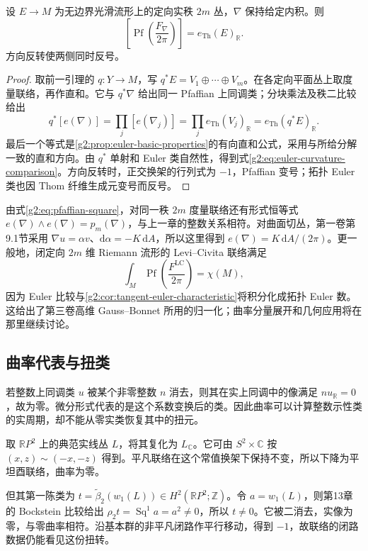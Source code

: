 \begin{theorem}\label{g2:thm:chern-weil-euler-comparison}
	设 \(E\to M\) 为无边界光滑流形上的定向实秩 \(2m\) 丛，\(\nabla\) 保持给定内积。则
	\begin{equation}\label{g2:eq:euler-curvature-comparison}
		\left[\operatorname{Pf}\!\left(\frac{F_\nabla}{2\pi}\right)\right]
		=e_{\mathrm{Th}}(E)_{\mathbb R}.
	\end{equation}
	方向反转使两侧同时反号。
\end{theorem}
\begin{proof}
	取前一引理的 \(q:Y\to M\)，写 \(q^*E=V_1\oplus\cdots\oplus V_m\)。在各定向平面丛上取度量联络，再作直和。它与 \(q^*\nabla\) 给出同一 Pfaffian 上同调类；分块乘法及秩二比较给出
	\[
		q^*[e(\nabla)]
		=\prod_j[e(\nabla_j)]
		=\prod_j e_{\mathrm{Th}}(V_j)_{\mathbb R}
		=e_{\mathrm{Th}}(q^*E)_{\mathbb R}.
	\]
	最后一个等式是\cref{g2:prop:euler-basic-properties}的有向直和公式，采用与所给分解一致的直和方向。由 \(q^*\) 单射和 Euler 类自然性，得到式\eqref{g2:eq:euler-curvature-comparison}。方向反转时，正交换架的行列式为 \(-1\)，Pfaffian 变号；拓扑 Euler 类也因 Thom 纤维生成元变号而反号。
\end{proof}

由式\eqref{g2:eq:pfaffian-square}，对同一秩 \(2m\) 度量联络还有形式恒等式 \(e(\nabla)\wedge e(\nabla)=p_m(\nabla)\)，与上一章的整数关系相符。对曲面切丛，第一卷第9.1节采用 \(\nabla u=\alpha v\)、\(\mathrm d\alpha=-K\,\mathrm dA\)，所以这里得到 \(e(\nabla)=K\,\mathrm dA/(2\pi)\)。更一般地，闭定向 \(2m\) 维 Riemann 流形的 Levi--Civita 联络满足
\begin{equation}\label{g2:eq:gauss-bonnet-curvature-input}
	\int_M\operatorname{Pf}\!\left(\frac{F^{\mathrm{LC}}}{2\pi}\right)=\chi(M),
\end{equation}
因为 Euler 比较与\cref{g2:cor:tangent-euler-characteristic}将积分化成拓扑 Euler 数。这给出了第三卷高维 Gauss--Bonnet 所用的归一化；曲率分量展开和几何应用将在那里继续讨论。

\subsection{曲率代表与扭类}
\label{g2:subsec:2203:04}
若整数上同调类 \(u\) 被某个非零整数 \(n\) 消去，则其在实上同调中的像满足 \(n u_{\mathbb R}=0\)，故为零。微分形式代表的是这个系数变换后的类。因此曲率可以计算整数示性类的实周期，却不能从零实类恢复其中的扭元。

\begin{example}\label{g2:exm:flat-torsion-chern-line}
	取 \(\mathbb RP^2\) 上的典范实线丛 \(L\)，将其复化为 \(L_{\mathbb C}\)。它可由 \(S^2\times\mathbb C\) 按 \((x,z)\sim(-x,-z)\) 得到。平凡联络在这个常值换架下保持不变，所以下降为平坦酉联络，曲率为零。

	但其第一陈类为 \(t=\widetilde\beta_2(w_1(L))\in H^2(\mathbb RP^2;\mathbb Z)\)。令 \(a=w_1(L)\)，则第13章的 Bockstein 比较给出 \(\rho_2t=\operatorname{Sq}^1a=a^2\ne0\)，所以 \(t\ne0\)。它被二消去，实像为零，与零曲率相符。沿基本群的非平凡闭路作平行移动，得到 \(-1\)，故联络的闭路数据仍能看见这份扭转。
\end{example}

